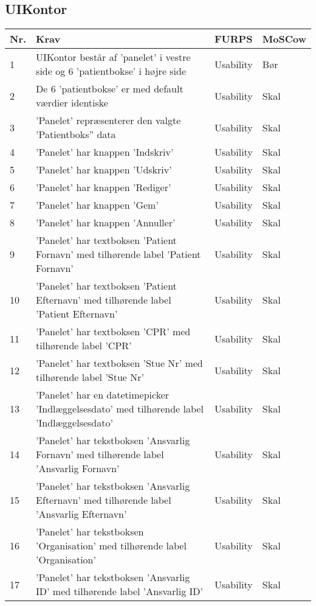 \subsection{UIKontor}
\begin{table}[H]
\begin{tabular}{|p{0.5cm}|p{6cm}|p{3cm}|p{3cm}|}
\hline
\textbf{Nr.} & \textbf{Krav} & \textbf{FURPS}& \textbf{MoSCow} \\\hline
1 & UIKontor består af 'panelet' i vestre side og 6 'patientbokse' i højre side & Usability & Bør \\\hline
2 & De 6 'patientbokse' er med default værdier identiske & Usability & Skal \\\hline
3 & 'Panelet' repræsenterer den valgte 'Patientboks'' data & Usability & Skal \\\hline
4 & 'Panelet' har knappen 'Indskriv' & Usability & Skal \\\hline
5 & 'Panelet' har knappen 'Udskriv' & Usability & Skal \\\hline
6 & 'Panelet' har knappen  'Rediger' & Usability & Skal \\\hline
7 & 'Panelet' har knappen  'Gem' & Usability & Skal \\\hline
8 & 'Panelet' har knappen  'Annuller' & Usability & Skal \\\hline
9 & 'Panelet' har textboksen  'Patient Fornavn' med tilhørende label 'Patient Fornavn' & Usability & Skal \\\hline
10 & 'Panelet' har textboksen  'Patient Efternavn' med tilhørende label 'Patient Efternavn' & Usability & Skal \\\hline
11 & 'Panelet' har textboksen  'CPR' med tilhørende label 'CPR' & Usability & Skal \\\hline
12 & 'Panelet' har textboksen  'Stue Nr' med tilhørende label 'Stue Nr' & Usability & Skal \\\hline
13 & 'Panelet' har en datetimepicker  'Indlæggelsesdato' med tilhørende label 'Indlæggelsesdato' & Usability & Skal \\\hline

14 & 'Panelet' har tekstboksen  'Ansvarlig Fornavn' med tilhørende label 'Ansvarlig Fornavn' & Usability & Skal \\\hline
15 & 'Panelet' har tekstboksen  'Ansvarlig Efternavn' med tilhørende label 'Ansvarlig Efternavn' & Usability & Skal \\\hline
16 & 'Panelet' har tekstboksen  'Organisation' med tilhørende label 'Organisation' & Usability & Skal \\\hline
17 & 'Panelet' har tekstboksen  'Ansvarlig ID' med tilhørende label 'Ansvarlig ID' & Usability & Skal \\\hline


\end{tabular}
\end{table}
